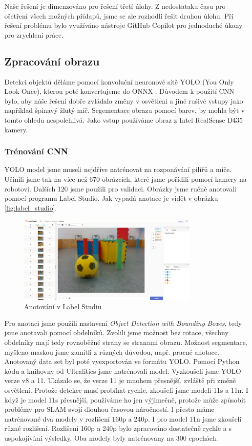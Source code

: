 \documentclass[a4paper,12pt]{article}
\begin{document}
Naše řešení je dimenzováno pro řešení třetí úlohy. Z nedostataku času pro ošetření všech možných přídapů, jsme se ale rozhodli řešit druhou úlohu. 
Při řešení problému bylo využíváno nástroje GitHub Copilot pro jednoduché úkony pro zrychlení práce. 
\subsection{Zpracování obrazu}
Detekci objektů děláme pomocí konvoluční neuronové sítě YOLO \cite{YOLO} (You Only Look Once), kterou poté konvertujeme do ONNX \cite{ONNX}. Důvodem k použití CNN bylo, aby náše řešení dobře zvládalo změny v osvětlení a jiné rušivé vstupy jako například špinavý žlutý míč. Segementace obrazu pomocí barev, by mohla být v tomto ohledu nespolehlivá. Jako vstup používáme obraz z Intel RealSense D435 kamery.
\subsubsection{Trénování CNN}
YOLO model jsme museli nejdříve natrénovat na rozponávání pilířů a míče. Učinili jsme tak na více než 670 obrázcích,
které jsme pořídili pomocí kamery na robotovi. Dalších 120 jsme použili pro validaci. Obrázky jsme ručně anotovali pomocí programu Label Studio. Jak vypadá anotace je vidět v obrázku \eqref{fig:label_studio}.
\begin{figure}[H]
    \centering
    \includegraphics[width=0.8\textwidth]{pictures/label_studio.png}
    \caption{Anotování v Label Studiu}
    \label{fig:label_studio}	
\end{figure}
Pro anotaci jsme použili nastavení \textit{Object Detection with Bounding Boxes}, tedy jsme anotavali pomocí obdelníků. Zvolili jsme možnost bez rotace, všechny obdelníky mají tedy rovnoběžné strany se stranami obrazu. 
Možnost segmentace, myšleno maskou jsme zamítli z různých důvodou, např. pracné anotace. 
Anotovaný data set byl poté vyexportován ve formátu YOLO.
Pomocí Python kódu a knihovny od Ultralitics \cite{Ultralitics} jsme natrénovali model. Vyzkoušeli jsme YOLO verze v8 a 11. Ukázalo se, že verze 11 je mnohem přesnější, zvláště při změně osvětlení. 
Protože detekce musí probíhat rychle, zkoušeli jsme modeli 11s a 11n. I když je model 11s přesnější, používáme ho jen výjimečně, protože může způsobit problémy pro SLAM svojí dlouhou časovou náročností. I přesto máme natrénované dva modely v rozlišení 160p a 240p.
I pro model 11n jsme zkoušeli různé rozlišení. Rozlišení 160p a 240p bylo zpracováno dostatečně rychle a s uspokojivími výsledky. Oba modely byly natrénovany na 300 epochách.
\end{document}

